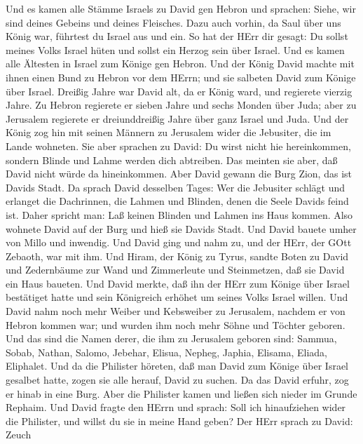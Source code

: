 Und es kamen alle Stämme Israels zu David gen Hebron und
sprachen: Siehe, wir sind deines Gebeins und deines Fleisches.
 Dazu auch vorhin, da Saul über uns König war, führtest du
Israel aus und ein. So hat der HErr dir gesagt: Du sollst meines Volks
Israel hüten und sollst ein Herzog sein über Israel.  Und es
kamen alle Ältesten in Israel zum Könige gen Hebron. Und der König David
machte mit ihnen einen Bund zu Hebron vor dem HErrn; und sie salbeten
David zum Könige über Israel.  Dreißig Jahre war David alt,
da er König ward, und regierete vierzig Jahre.  Zu Hebron
regierete er sieben Jahre und sechs Monden über Juda; aber zu Jerusalem
regierete er dreiunddreißig Jahre über ganz Israel und Juda.
 Und der König zog hin mit seinen Männern zu Jerusalem wider
die Jebusiter, die im Lande wohneten. Sie aber sprachen zu David: Du
wirst nicht hie hereinkommen, sondern Blinde und Lahme werden dich
abtreiben. Das meinten sie aber, daß David nicht würde da hineinkommen.
 Aber David gewann die Burg Zion, das ist Davids Stadt.
 Da sprach David desselben Tages: Wer die Jebusiter schlägt
und erlanget die Dachrinnen, die Lahmen und Blinden, denen die Seele
Davids feind ist. Daher spricht man: Laß keinen Blinden und Lahmen ins
Haus kommen.  Also wohnete David auf der Burg und hieß sie
Davids Stadt. Und David bauete umher von Millo und inwendig.
 Und David ging und nahm zu, und der HErr, der GOtt
Zebaoth, war mit ihm.  Und Hiram, der König zu Tyrus,
sandte Boten zu David und Zedernbäume zur Wand und Zimmerleute und
Steinmetzen, daß sie David ein Haus baueten.  Und David
merkte, daß ihn der HErr zum Könige über Israel bestätiget hatte und
sein Königreich erhöhet um seines Volks Israel willen.  Und
David nahm noch mehr Weiber und Kebsweiber zu Jerusalem, nachdem er von
Hebron kommen war; und wurden ihm noch mehr Söhne und Töchter geboren.
 Und das sind die Namen derer, die ihm zu Jerusalem geboren
sind: Sammua, Sobab, Nathan, Salomo,  Jebehar, Elisua,
Nepheg, Japhia,  Elisama, Eliada, Eliphalet. 
Und da die Philister höreten, daß man David zum Könige über Israel
gesalbet hatte, zogen sie alle herauf, David zu suchen. Da das David
erfuhr, zog er hinab in eine Burg.  Aber die Philister
kamen und ließen sich nieder im Grunde Rephaim.  Und David
fragte den HErrn und sprach: Soll ich hinaufziehen wider die Philister,
und willst du sie in meine Hand geben? Der HErr sprach zu David: Zeuch
